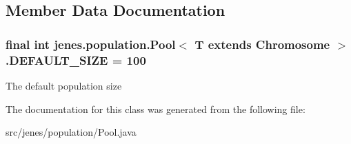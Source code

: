 \subsection{Member Data Documentation}
\hypertarget{classjenes_1_1population_1_1_pool_3_01_t_01extends_01_chromosome_01_4_7495db191e994037e32f9869c83db6b3}{
\subsubsection[DEFAULT\_\-SIZE]{\setlength{\rightskip}{0pt plus 5cm}final int jenes.population.Pool$<$ T extends Chromosome $>$.{\bf DEFAULT\_\-SIZE} = 100}}
\label{classjenes_1_1population_1_1_pool_3_01_t_01extends_01_chromosome_01_4_7495db191e994037e32f9869c83db6b3}


The default population size 

The documentation for this class was generated from the following file:\begin{CompactItemize}
\item 
src/jenes/population/Pool.java\end{CompactItemize}
